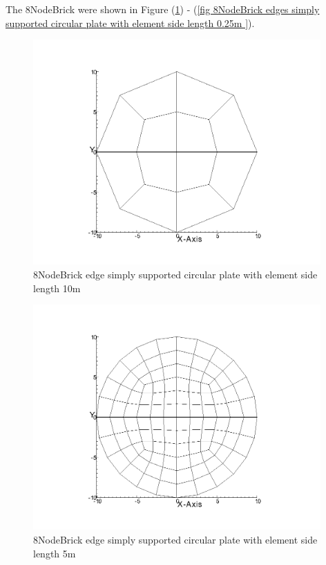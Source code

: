 \documentclass[fleqn,11pt,letter]{article}
\begin{document}
The 8NodeBrick were shown in Figure (\ref{fig 8NodeBrick edges simply supported circular plate with element side length 10m }) - (\ref{fig 8NodeBrick edges simply supported circular plate with element side length 0.25m }). 



\begin{figure}[H]
  \centering
  \includegraphics[width=11cm]{../Figure_files/8NodeBrick/circular_plate1.png}
  \caption{8NodeBrick edge simply supported circular plate with element side length 10m }
  \label{fig 8NodeBrick edges simply supported circular plate with element side length 10m }
\end{figure}

\newpage

\begin{figure}[H]
  \centering
  \includegraphics[width=11cm]{../Figure_files/8NodeBrick/circular_plate2.png}
  \caption{8NodeBrick edge simply supported circular plate with element side length 5m }
  \label{fig 8NodeBrick edges simply supported circular plate with element side length 5m }
\end{figure}
\end{document}
